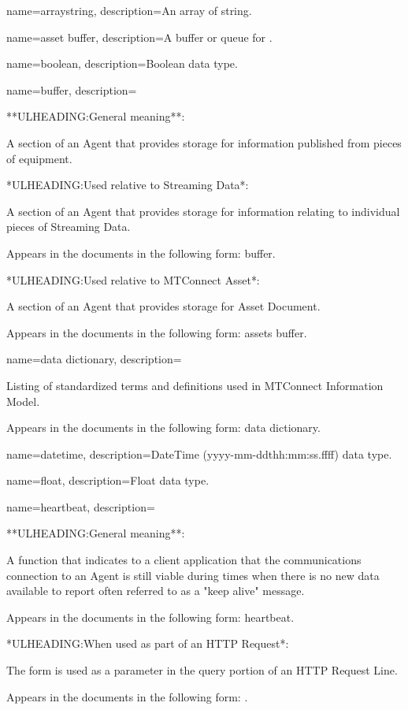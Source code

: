 {
    name={arraystring},
	description={An array of \gls{string}.}
}

{
    name={asset buffer},
	description={A buffer or queue for .}
}

{
    name={boolean},
	description={Boolean data type.}
}

{
    name={buffer},
	description={
  **ULHEADING:General meaning**:

  A section of an \gls{Agent} that provides storage for information published from pieces of equipment.

  *ULHEADING:Used relative to \gls{Streaming Data}*:

  A section of an \gls{Agent} that provides storage for information relating to individual pieces of \gls{Streaming Data}. 
  
  Appears in the documents in the following form: \gls{buffer}.

  *ULHEADING:Used relative to \gls{MTConnect Asset}*:

  A section of an \gls{Agent} that provides storage for \gls{Asset Document}.

  Appears in the documents in the following form: \gls{assets buffer}.
}
}

{
    name={data dictionary},
	description={
	Listing of standardized terms and definitions used in \gls{MTConnect Information Model}.

	Appears in the documents in the following form: \gls{data dictionary}.
}
}

{
    name={datetime},
	description={DateTime (yyyy-mm-ddthh:mm:ss.ffff) data type.}
}

{
    name={float},
	description={Float data type.}
}

{
    name={heartbeat},
	description={
	**ULHEADING:General meaning**:

	A function that indicates to a client application that the communications connection to an \gls{Agent} is still viable during times when there is no new data available to report  often referred to as a "keep alive" message.

	Appears in the documents in the following form: \gls{heartbeat}.

	*ULHEADING:When used as part of an \gls{HTTP Request}*:

	The form  is used as a parameter in the query portion of an \gls{HTTP Request Line}.

	Appears in the documents in the following form: .
}
}


